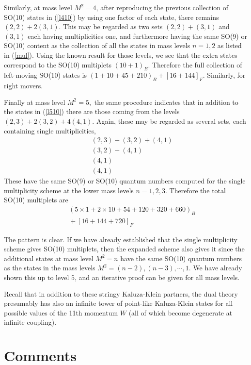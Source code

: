 Similarly, at mass level $M^2=4$, after reproducing the previous collection
of SO(10) states in (\ref{l410}) by using one factor of each state, there
remains $(2,2)+2(3,1).$ This may be regarded as two sets $(2,2)+(3,1)$ and $%
(3,1)$ each having multiplicities one, and furthermore having the same SO(9)
or SO(10) content as the collection of all the states in mass levels $n=1,2$
as listed in (\ref{mul})$.$ Using the known result for those levels, we see
that the extra states correspond to the SO(10) multiplets $\left(
10+1\right) _B.$ Therefore the full collection of left-moving SO(10) states
is $\left( 1+10+45+210\right) _B+\left[ 16+144\right] _F.$ Similarly, for
right movers.

Finally at mass level $M^2=5,$ the same procedure indicates that in addition
to the states in (\ref{l510}) there are those coming from the levels $%
(2,3)+2(3,2)+4(4,1).$ Again, these may be regarded as several sets, each
containing single multiplicities,
\begin{eqnarray}
&&\ (2,3)+(3,2)+(4,1)  \nonumber \\
&&\ (3,2)+(4,1) \\
&&\ (4,1)  \nonumber \\
&&\ (4,1)  \nonumber
\end{eqnarray}
These have the same SO(9) or SO(10) quantum numbers computed for the single
multiplicity scheme at the lower mass levels $n=1,2,3.$ Therefore the total
SO(10) multiplets are
\begin{eqnarray}
&&\ \left( 5\times 1+2\times 10+54+120+320+660\right) _B \\
&&\ +\left[ 16+144+720\right] _F  \nonumber
\end{eqnarray}

The pattern is clear. If we have already established that the single
multiplicity scheme gives SO(10) multiplets, then the expanded scheme also
gives it since the additional states at mass level $M^2=n$ have the same
SO(10) quantum numbers as the states in the mass levels $M^2=(n-2),(n-3),%
\cdots ,1.$ We have already shown this up to level 5, and an iterative proof
can be given for all mass levels.

Recall that in addition to these stringy Kaluza-Klein partners, the dual
theory presumably has also an infinite tower of point-like Kaluza-Klein
states for all possible values of the 11th momentum $W$ (all of which become
degenerate at infinite coupling).

\section{Comments}

